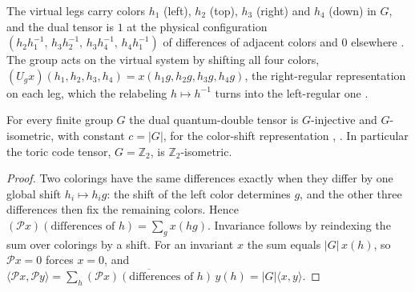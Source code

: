 \begin{definition}%
    \label{def:peps_quantum_double_dual}
    \leanok
    The virtual legs carry colors $h_1$ (left), $h_2$ (top), $h_3$ (right)
    and $h_4$ (down) in $G$, and the dual tensor is $1$ at the physical
    configuration
    $(h_2h_1^{-1},\,h_3h_2^{-1},\,h_3h_4^{-1},\,h_4h_1^{-1})$ of differences
    of adjacent colors and $0$ elsewhere \cite[Appendix~A, ``The Toric Code
        and quantum double models'']{Cirac2021Matrix}. The group acts on the
    virtual system by shifting all four colors,
    $(U_gx)(h_1,h_2,h_3,h_4)=x(h_1g,h_2g,h_3g,h_4g)$, the right-regular
    representation on each leg, which the relabeling $h\mapsto h^{-1}$
    turns into the left-regular one
    \cite{gap:rmp_peps_quantum_double_g_isometry}.
\end{definition}

\begin{lemma}%
    \label{thm:peps_quantum_double_dual_g_isometric}
    \leanok
    For every finite group $G$ the dual quantum-double tensor is
    $G$-injective and $G$-isometric, with constant $c=|G|$, for the
    color-shift representation
    \cite[Appendix~A, ``The Toric Code and quantum double
        models'']{Cirac2021Matrix},
    \cite[Section~``Examples'', ``The double models'']{Schuch2010PEPS}.
    In particular the toric code tensor, $G=\mathbb{Z}_2$, is
    $\mathbb{Z}_2$-isometric.
\end{lemma}

\begin{proof}\leanok
    Two colorings have the same differences exactly when they differ by one
    global shift $h_i\mapsto h_ig$: the shift of the left color determines
    $g$, and the other three differences then fix the remaining colors.
    Hence $(\mathcal{P}x)(\text{differences of }h)=\sum_{g}x(hg)$. Invariance
    follows by reindexing the sum over colorings by a shift. For an
    invariant $x$ the sum equals $|G|\,x(h)$, so $\mathcal{P}x=0$ forces
    $x=0$, and
    $\langle\mathcal{P}x,\mathcal{P}y\rangle
        =\sum_h\overline{(\mathcal{P}x)(\text{differences of }h)}\,y(h)
        =|G|\langle x,y\rangle$.
\end{proof}

